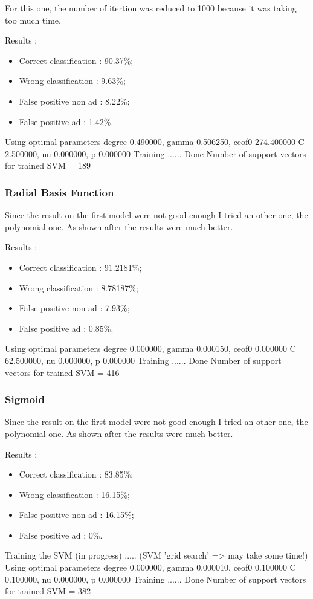 For this one, the number of itertion was reduced to 1000 because it was taking too much time.

Results :
\begin{itemize}
  \item Correct classification : 90.37\%;
  \item Wrong classification : 9.63\%;
  \item False positive non ad : 8.22\%;
  \item False positive ad : 1.42\%.
\end{itemize}
Using optimal parameters degree 0.490000, gamma 0.506250, ceof0 274.400000
	 C 2.500000, nu 0.000000, p 0.000000
 Training ...... Done
Number of support vectors for trained SVM = 189

\subsubsection{Radial Basis Function}

Since the result on the first model were not good enough I tried an other one, the polynomial one. As shown after the results were much better.

Results :
\begin{itemize}
  \item Correct classification : 91.2181\%;
  \item Wrong classification : 8.78187\%;
  \item False positive non ad : 7.93\%;
  \item False positive ad : 0.85\%.
\end{itemize}
Using optimal parameters degree 0.000000, gamma 0.000150, ceof0 0.000000
	 C 62.500000, nu 0.000000, p 0.000000
 Training ...... Done
Number of support vectors for trained SVM = 416


\subsubsection{Sigmoid}

Since the result on the first model were not good enough I tried an other one, the polynomial one. As shown after the results were much better.

Results :
\begin{itemize}
  \item Correct classification : 83.85\%;
  \item Wrong classification : 16.15\%;
  \item False positive non ad : 16.15\%;
  \item False positive ad : 0\%.
\end{itemize}
Training the SVM (in progress) ..... (SVM 'grid search' => may take some time!)
Using optimal parameters degree 0.000000, gamma 0.000010, ceof0 0.100000
	 C 0.100000, nu 0.000000, p 0.000000
 Training ...... Done
Number of support vectors for trained SVM = 382

